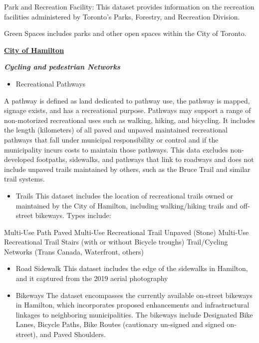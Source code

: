 \documentclass[
11pt, %
oneside, %
english, %
singlespacing, %
]{macthesis} %
\def\tightlist{}
\begin{document}
Park and Recreation Facility: This dataset provides information on the recreation facilities administered by Toronto's Parks, Forestry, and Recreation Division.

Green Spaces includes parks and other open spaces within the City of Toronto.

\textbf{\href{https://open.hamilton.ca/}{City of Hamilton}}

\textbf{\emph{Cycling and pedestrian Networks}}

\begin{itemize}
\tightlist
\item
  Recreational Pathways
\end{itemize}

A pathway is defined as land dedicated to pathway use, the pathway is mapped, signage exists, and has a recreational purpose. Pathways may support a range of non-motorized recreational uses such as walking, hiking, and bicycling. It includes the length (kilometers) of all paved and unpaved maintained recreational pathways that fall under municipal responsibility or control and if the municipality incurs costs to maintain those pathways. This data excludes non-developed footpaths, sidewalks, and pathways that link to roadways and does not include unpaved trails maintained by others, such as the Bruce Trail and similar trail systems.

\begin{itemize}
\tightlist
\item
  Trails This dataset includes the location of recreational trails owned or maintained by the City of Hamilton, including walking/hiking trails and off-street bikeways. Types include:
\end{itemize}

Multi-Use Path Paved Multi-Use Recreational Trail Unpaved (Stone) Multi-Use Recreational Trail Stairs (with or without Bicycle troughs) Trail/Cycling Networks (Trans Canada, Waterfront, others)

\begin{itemize}
\item
  Road Sidewalk This dataset includes the edge of the sidewalks in Hamilton, and it captured from the 2019 aerial photography
\item
  Bikeways The dataset encompasses the currently available on-street bikeways in Hamilton, which incorporates proposed enhancements and infrastructural linkages to neighboring municipalities. The bikeways include Designated Bike Lanes, Bicycle Paths, Bike Routes (cautionary un-signed and signed on-street), and Paved Shoulders.
\end{itemize}
\end{document}
